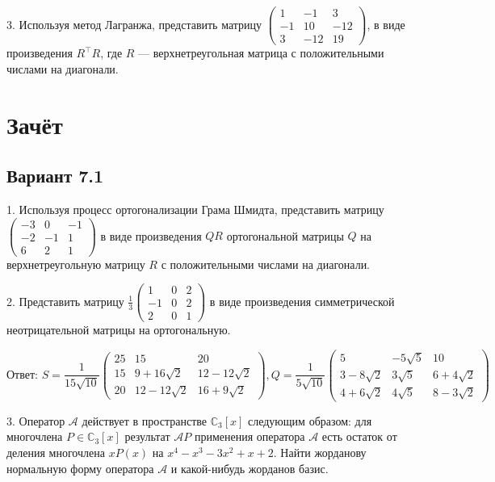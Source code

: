 \documentclass[a4paper]{article}
\begin{document}
3. Используя метод Лагранжа, представить матрицу $\left(
\begin{array}{rrr}
1 & -1 & 3 \\
-1 & 10 & -12 \\
3 & -12 & 19
\end{array}
\right)$, в виде произведения $R^\top R$, где $R$ ---
верхнетреугольная матрица с положительными числами на диагонали.

\section{Зачёт }

\subsection{Вариант 7.1}

1. Используя процесс ортогонализации Грама Шмидта, представить
мат\-ри\-цу $\left(
\begin{array}{rrr}
-3 & 0 & -1 \\
-2 & -1 & 1 \\
6 & 2 & 1
\end{array}
\right) $ в виде произведения $QR$ ортогональной матрицы $Q$ на
верхнетреугольную матрицу $R$ с положительными числами на
диагонали.

2. Представить матрицу $\displaystyle\frac{1}{3}\left(
\begin{array}{rrr}
1 & 0 & 2 \\
-1 & 0 & 2 \\
2 & 0 & 1
\end{array}\right)
$ в виде произведения симметрической неотрицательной матрицы на
ортогональную.

$$
\textit{Ответ:\ } S=\displaystyle\frac{1}{15\sqrt{10}} \left(
\begin{array}{ccc}
25 & 15 & 20 \\
15 & 9+16\sqrt 2 & 12-12\sqrt 2 \\
20 & 12-12\sqrt 2 & 16+9\sqrt 2
\end{array}
\right), Q=\displaystyle\frac{1}{5\sqrt{10}}\left(
\begin{array}{ccc}
5 & -5\sqrt 5 & 10 \\
3-8\sqrt 2 & 3\sqrt 5 & 6+4\sqrt 2 \\
4+6\sqrt 2 & 4\sqrt 5 & 8-3\sqrt 2
\end{array}
\right)
$$

3. Оператор $\mathcal{A}$ действует в пространстве
$\mathbb{C}_3[x]$ следующим образом: для многочлена
$P\in\mathbb{C}_3[x]$ результат $\mathcal{A}P$ применения
оператора $\mathcal{A}$ есть остаток от деления многочлена $xP(x)$
на $x^4-x^3-3x^2+x+2$. Найти жорданову нормальную форму оператора
$\mathcal{A}$ и какой-нибудь жорданов базис.
\end{document}
